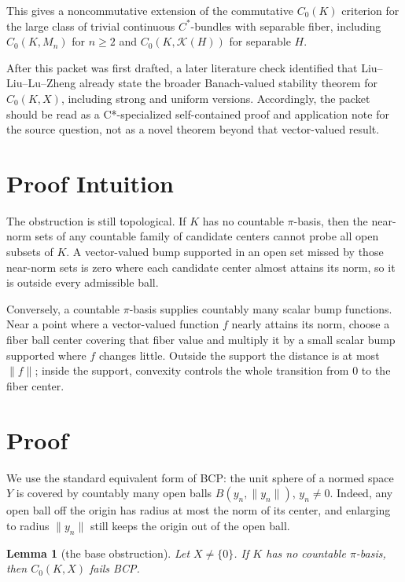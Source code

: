\documentclass[11pt]{article}
\newtheorem{lemma}{Lemma}
\begin{document}
This gives a noncommutative extension of the commutative \(C_0(K)\) criterion
for the large class of trivial continuous \(C^*\)-bundles with separable fiber,
including \(C_0(K,M_n)\) for \(n\ge2\) and \(C_0(K,\mathcal K(H))\) for
separable \(H\).

After this packet was first drafted, a later literature check identified that
Liu--Liu--Lu--Zheng \cite{LLLZ} already state the broader Banach-valued
stability theorem for \(C_0(K,X)\), including strong and uniform versions.
Accordingly, the packet should be read as a C*-specialized self-contained
proof and application note for the source question, not as a novel theorem
beyond that vector-valued result.

\section*{Proof Intuition}

The obstruction is still topological.  If \(K\) has no countable \(\pi\)-basis,
then the near-norm sets of any countable family of candidate centers cannot
probe all open subsets of \(K\).  A vector-valued bump supported in an open set
missed by those near-norm sets is zero where each candidate center almost
attains its norm, so it is outside every admissible ball.

Conversely, a countable \(\pi\)-basis supplies countably many scalar bump
functions.  Near a point where a vector-valued function \(f\) nearly attains its
norm, choose a fiber ball center covering that fiber value and multiply it by a
small scalar bump supported where \(f\) changes little.  Outside the support the
distance is at most \(\|f\|\); inside the support, convexity controls the whole
transition from \(0\) to the fiber center.

\section*{Proof}

We use the standard equivalent form of BCP: the unit sphere of a normed space
\(Y\) is covered by countably many open balls \(B(y_n,\|y_n\|)\), \(y_n\ne0\).
Indeed, any open ball off the origin has radius at most the norm of its center,
and enlarging to radius \(\|y_n\|\) still keeps the origin out of the open ball.

\begin{lemma}[the base obstruction]
\label{lem:base-obstruction}
Let \(X\ne\{0\}\).  If \(K\) has no countable \(\pi\)-basis, then
\(C_0(K,X)\) fails BCP.
\end{lemma}
\end{document}
